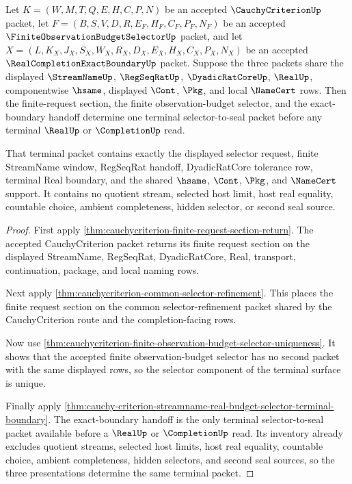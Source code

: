 \begin{theorem}
\label{thm:cauchycriterion-selector-budget-three-way-terminality}
Let $K=(W,M,T,Q,E,H,C,P,N)$ be an accepted $\CauchyCriterionUp$ packet, let
$F=(B,S,V,D,R,E_F,H_F,C_F,P_F,N_F)$ be an accepted
$\FiniteObservationBudgetSelectorUp$ packet, and let
$X=(L,K_X,J_X,S_X,W_X,R_X,D_X,E_X,H_X,C_X,P_X,N_X)$ be an accepted
$\RealCompletionExactBoundaryUp$ packet. Suppose the three packets share the
displayed $\StreamNameUp$, $\RegSeqRatUp$, $\DyadicRatCoreUp$, $\RealUp$,
componentwise $\hsame$, displayed $\Cont$, $\Pkg$, and local $\NameCert$ rows.
Then the finite-request section, the finite observation-budget selector, and
the exact-boundary handoff determine one terminal selector-to-seal packet before
any terminal $\RealUp$ or $\CompletionUp$ read.

That terminal packet contains exactly the displayed selector request, finite
StreamName window, RegSeqRat handoff, DyadicRatCore tolerance row, terminal Real
boundary, and the shared $\hsame$, $\Cont$, $\Pkg$, and $\NameCert$ support. It
contains no quotient stream, selected host limit, host real equality, countable
choice, ambient completeness, hidden selector, or second seal source.
\end{theorem}
\begin{proof}
First apply \autoref{thm:cauchycriterion-finite-request-section-return}. The
accepted CauchyCriterion packet returns its finite request section on the
displayed StreamName, RegSeqRat, DyadicRatCore, Real, transport, continuation,
package, and local naming rows.

Next apply \autoref{thm:cauchycriterion-common-selector-refinement}. This
places the finite request section on the common selector-refinement packet
shared by the CauchyCriterion route and the completion-facing rows.

Now use
\autoref{thm:cauchycriterion-finite-observation-budget-selector-uniqueness}. It
shows that the accepted finite observation-budget selector has no second packet
with the same displayed rows, so the selector component of the terminal surface
is unique.

Finally apply
\autoref{thm:cauchy-criterion-streamname-real-budget-selector-terminal-boundary}.
The exact-boundary handoff is the only terminal selector-to-seal packet available
before a $\RealUp$ or $\CompletionUp$ read. Its inventory already excludes
quotient streams, selected host limits, host real equality, countable choice,
ambient completeness, hidden selectors, and second seal sources, so the three
presentations determine the same terminal packet.
\end{proof}


